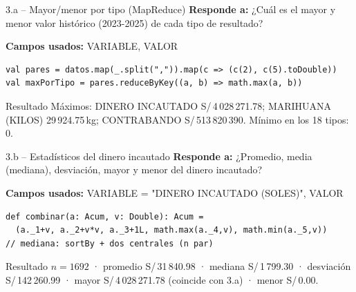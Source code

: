 \documentclass[10pt,aspectratio=169]{beamer}
\newcommand{\campos}[1]{\textbf{Campos usados:} #1\par\vspace{2pt}}
\newcommand{\respondea}[1]{\textbf{Responde a:} #1\par\vspace{2pt}}
\begin{document}
\begin{frame}[fragile]{3.a -- Mayor/menor por tipo (MapReduce)}
\respondea{¿Cu\'al es el mayor y menor valor hist\'orico (2023-2025) de cada tipo de resultado?}
\campos{VARIABLE, VALOR}
\begin{verbatim}
val pares = datos.map(_.split(",")).map(c => (c(2), c(5).toDouble))
val maxPorTipo = pares.reduceByKey((a, b) => math.max(a, b))
\end{verbatim}
\begin{dato}[uni]{Resultado}
\footnotesize M\'aximos: DINERO INCAUTADO S/\,4\,028\,271.78; MARIHUANA (KILOS) 29\,924.75\,kg;
CONTRABANDO S/\,513\,820\,390. M\'inimo en los 18 tipos: 0.
\end{dato}
\end{frame}

\begin{frame}[fragile]{3.b -- Estad\'isticos del dinero incautado}
\respondea{¿Promedio, media (mediana), desviaci\'on, mayor y menor del dinero incautado?}
\campos{VARIABLE = "DINERO INCAUTADO (SOLES)", VALOR}
\begin{verbatim}
def combinar(a: Acum, v: Double): Acum =
  (a._1+v, a._2+v*v, a._3+1L, math.max(a._4,v), math.min(a._5,v))
// mediana: sortBy + dos centrales (n par)
\end{verbatim}
\begin{dato}[job2]{Resultado}
\footnotesize $n=1692$ · promedio S/\,31\,840.98 · mediana S/\,1\,799.30 · desviaci\'on
S/\,142\,260.99 · mayor S/\,4\,028\,271.78 (coincide con 3.a) · menor S/\,0.00.
\end{dato}
\end{frame}
\end{document}
